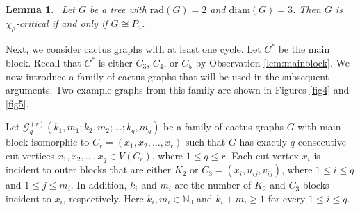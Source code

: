 \documentclass[12pt]{article}
\newtheorem{lemma}[theorem]{Lemma}
\begin{document}
\begin{lemma}~{\rm \cite{bresar-2022}}\label{pro3} 
Let \( G \) be a tree with $\mathrm{rad}(G) = 2$  and  $\mathrm{diam}(G) = 3$. Then \( G \) is \( \chi_{\rho} \)-critical if and only if \( G \cong P_4 \).
\end{lemma}

Next, we consider cactus graphs with at least one cycle. Let $C^*$ be the main block. Recall that $C^*$ is either $C_3$, $C_4$, or $C_5$ by Observation \ref{lem:mainblock}. We now introduce a family of cactus graphs that will be used in the subsequent arguments. Two example graphs from this family are shown in Figures \ref{fig4} and \ref{fig5}.

Let ${\mathcal{G}_{q}^{(r)}(k_{1},m_{1};k_{2},m_{2};\dots;k_{q},m_{q})}$ be a family of cactus graphs \( G \) with main block isomorphic to $C_r= (x_1, x_2, \dots, x_r)$ such that \( G \) has exactly $q$ consecutive cut vertices $ x_1, x_2, \dots, x_q \in V(C_r)$, where $1 \leq q \leq r$. Each cut vertex $x_i$ is incident to outer blocks that are either $K_2$ or $C_3 = (x_i, u_{ij}, v_{ij})$, where $1 \leq i \leq q$ and $1 \leq j \leq m_i$. In addition, $k_i$ and $m_i$ are the number of $K_2$ and $C_3$ blocks incident to $x_i$, respectively.
Here \( k_i, m_i \in \mathbb{N}_0 \) and \( k_i + m_i \ge 1 \) for every $1 \leq i \leq q$.
\end{document}
